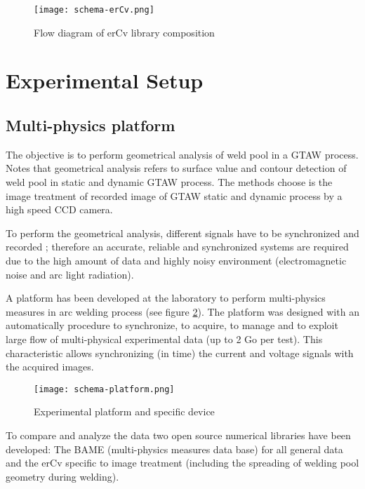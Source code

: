 \begin{Segmentation}
\begin{figure}
\begin{center}
\texttt{[image: schema-erCv.png]}
\caption{{\small Flow diagram of erCv library composition}}
\label{schema-erCv}
\end{center}
\end{figure}



\section{Experimental Setup}
\label{experimental_setup}

\subsection{Multi-physics platform}
\label{multi_physics_platform}

The objective is to perform geometrical analysis of weld pool
 in a GTAW process. Notes that geometrical analysis refers to
 surface value and contour detection of weld pool in static and 
dynamic GTAW process. The methods choose is the image treatment 
of recorded image of GTAW static and dynamic process by a high
 speed CCD camera.

To perform the geometrical analysis, different signals have to be 
synchronized and recorded \cite{CHAPUIS}; therefore an accurate,
 reliable and synchronized systems are required due to the high
 amount of data and highly noisy environment (electromagnetic 
noise and arc light radiation). 

A platform has been developed at the laboratory to perform multi-physics
 measures in arc welding process (see figure \ref{schema-platform}). 
The platform was designed with an automatically procedure to synchronize,
 to acquire, to manage and to exploit large flow of multi-physical
 experimental data (up to 2 Go per test). This characteristic allows
 synchronizing (in time) the current and voltage signals with 
the acquired images.

\begin{figure}
\begin{center}
\texttt{[image: schema-platform.png]}
\caption{{\small Experimental platform and specific device}}
\label{schema-platform}
\end{center}
\end{figure}

To compare and analyze the data two open source numerical libraries
 have been developed: The BAME (multi-physics measures data base)
 for all general data and the erCv specific to image treatment 
(including the spreading of welding pool geometry during welding).




\end{Segmentation}
